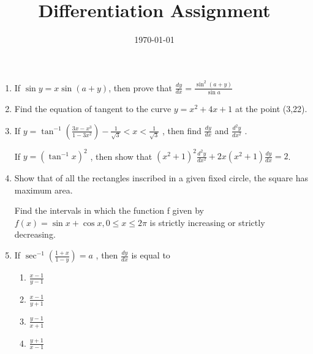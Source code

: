 \documentclass[12pt]{article}
\title{Differentiation Assignment}
\date{\today}
\begin{document}

\begin{enumerate}

\item If $\sin y=x\sin(a+y)$, then prove that $\frac{dy}{dx}=\frac{\sin^2(a+y)}{\sin a}$


\item Find the equation of tangent to the curve $y=x^2+4x+1$ at the point (3,22).



\item If $y=\tan^{-1}(\frac{3x-x^3}{1-3x^2})-\frac{1}{\sqrt{3}}<x<\frac{1}{\sqrt{3}}$ , then find $\frac{dy}{dx}$ and $\frac{d^2y}{dx^2}$ .


    
If $y=(\tan^{-1} x)^2$ , then show that $(x^2+1)^2 \frac{d^2y}{dx^2}+2x(x^2+1) \frac{dy}{dx}=2$.

\item Show that of all the rectangles inscribed in a given fixed circle, the square has maximum area.
  

Find the intervals in which the function f given by $f(x)=\sin x+\cos x, 0 \le x \le 2\pi$ is strictly increasing or strictly decreasing.


\item If $\sec^{-1}(\frac{1+x}{1-y})=a$ , then $\frac{dy}{dx}$ is equal to
\begin{enumerate}
\item $\frac{x-1}{y-1}$
\item $\frac{x-1}{y+1}$
\item $\frac{y-1}{x+1}$
\item $\frac{y+1}{x-1}$
\end{enumerate}



\end{enumerate}
\end{document}
